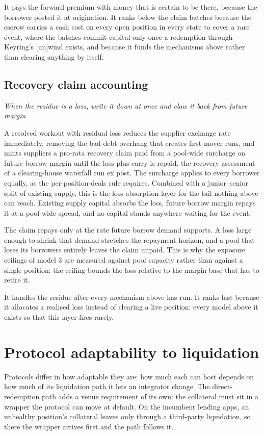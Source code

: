 \documentclass[11pt,a4paper]{article}
\newcommand{\model}[2]{\subsection{#1}\noindent\textit{#2}\medskip}
\begin{document}
It pays the forward premium with money that is certain to be there, because the borrower posted it at origination. It ranks below the claim batches because the escrow carries a cash cost on every open position in every state to cover a rare event, where the batches commit capital only once a redemption through Keyring's [un]wind exists, and because it funds the mechanisms above rather than clearing anything by itself.

\model{Recovery claim accounting}{When the residue is a loss, write it down at once and claw it back from future margin.}

A resolved workout with residual loss reduces the supplier exchange rate immediately, removing the bad-debt overhang that creates first-mover runs, and mints suppliers a pro-rata recovery claim paid from a pool-wide surcharge on future borrow margin until the loss plus carry is repaid, the recovery assessment of a clearing-house waterfall run ex post. The surcharge applies to every borrower equally, as the per-position-deals rule requires. Combined with a junior--senior split of existing supply, this is the loss-absorption layer for the tail nothing above can reach. Existing supply capital absorbs the loss, future borrow margin repays it at a pool-wide spread, and no capital stands anywhere waiting for the event.

The claim repays only at the rate future borrow demand supports. A loss large enough to shrink that demand stretches the repayment horizon, and a pool that loses its borrowers entirely leaves the claim unpaid. This is why the exposure ceilings of model 3 are measured against pool capacity rather than against a single position: the ceiling bounds the loss relative to the margin base that has to retire it.

It handles the residue after every mechanism above has run. It ranks last because it allocates a realised loss instead of clearing a live position: every model above it exists so that this layer fires rarely.

\section{Protocol adaptability to liquidation}\label{sec:protocols}

Protocols differ in how adaptable they are: how much each can host depends on how much of its liquidation path it lets an integrator change. The direct-redemption path adds a venue requirement of its own: the collateral must sit in a wrapper the protocol can move at default. On the incumbent lending apps, an unhealthy position's collateral leaves only through a third-party liquidation, so there the wrapper arrives first and the path follows it.
\end{document}
